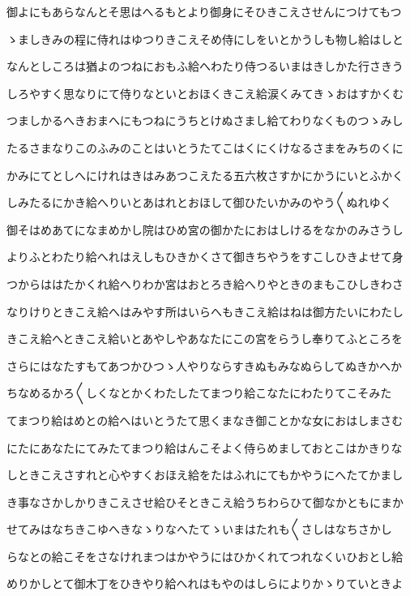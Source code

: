 \documentclass[a4paper,11pt,landscape]{ltjtarticle}
\begin{document}
御よにもあらなんとそ思はへるもとより御身にそひきこえさせんにつけてもつ
\par\medskip
ゝましきみの程に侍れはゆつりきこえそめ侍にしをいとかうしも物し給はしと
\par\medskip
なんとしころは猶よのつねにおもふ給へわたり侍つるいまはきしかた行さきう
\par\medskip
しろやすく思なりにて侍りなといとおほくきこえ給涙くみてきゝおはすかくむ
\par\medskip
つましかるへきおまへにもつねにうちとけぬさまし給てわりなくものつゝみし
\par\medskip
たるさまなりこのふみのことはいとうたてこはくにくけなるさまをみちのくに
\par\medskip
かみにてとしへにけれはきはみあつこえたる五六枚さすかにかうにいとふかく
\par\medskip
しみたるにかき給へりいとあはれとおほして御ひたいかみのやう〱ぬれゆく
\par\medskip
御そはめあてになまめかし院はひめ宮の御かたにおはしけるをなかのみさうし
\par\medskip
よりふとわたり給へれはえしもひきかくさて御きちやうをすこしひきよせて身
\par\medskip
つからははたかくれ給へりわか宮はおとろき給へりやときのまもこひしきわさ
\par\medskip
なりけりときこえ給へはみやす所はいらへもきこえ給はねは御方たいにわたし
\par\medskip
きこえ給へときこえ給いとあやしやあなたにこの宮をらうし奉りてふところを
\par\medskip
さらにはなたすもてあつかひつゝ人やりならすきぬもみなぬらしてぬきかへか
\par\medskip
ちなめるかろ〱しくなとかくわたしたてまつり給こなたにわたりてこそみた
\par\medskip
てまつり給はめとの給へはいとうたて思くまなき御ことかな女におはしまさむ
\par\medskip
にたにあなたにてみたてまつり給はんこそよく侍らめましておとこはかきりな
\par\medskip
しときこえさすれと心やすくおほえ給をたはふれにてもかやうにへたてかまし
\par\medskip
き事なさかしかりきこえさせ給ひそときこえ給うちわらひて御なかともにまか
\par\medskip
せてみはなちきこゆへきなゝりなへたてゝいまはたれも〱さしはなちさかし
\par\medskip
らなとの給こそをさなけれまつはかやうにはひかくれてつれなくいひおとし給
\par\medskip
めりかしとて御木丁をひきやり給へれはもやのはしらによりかゝりていときよ
\end{document}
